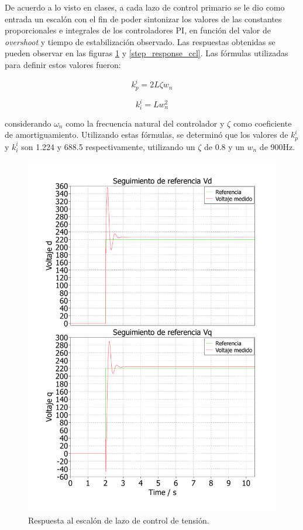 De acuerdo a lo visto en clases, a cada lazo de control primario se le dio como entrada un escalón con el fin de poder sintonizar los valores de las constantes proporcionales e integrales de los controladores PI, en función del valor de \textit{overshoot} y tiempo de estabilización observado. Las respuestas obtenidas se pueden observar en las figuras \ref{step_response_vcl} y \ref{step_response_ccl}. Las fórmulas utilizadas para definir estos valores fueron:

\begin{equation}
    k_p^i = 2L\zeta w_{n}
\end{equation}

\begin{equation}
    k_i^i = Lw_{n}^2
\end{equation}

considerando $\omega_n$ como la frecuencia natural del controlador y $\zeta$ como coeficiente de amortiguamiento. Utilizando estas fórmulas, se determinó que los valores de $k_p^i$ y $k_i^i$ son 1.224 y 688.5 respectivamente, utilizando un $\zeta$ de 0.8 y un $w_{n}$ de 900Hz.

\begin{figure}
   \centering
   \includegraphics[width=0.5\linewidth]{Tarea 1/report/imagenes/p1c/respuesta_escalon_vcl.pdf}
   \caption{Respuesta al escalón de lazo de control de tensión.}
   \label{step_response_vcl}
\end{figure}

